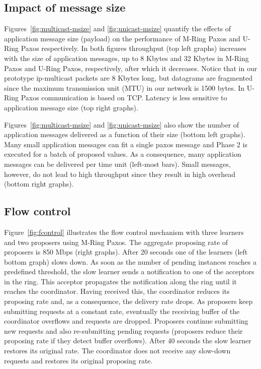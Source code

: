 \documentclass[final,3p,times,twocolumn,authoryear]{elsarticle}
\begin{document}
\subsection{Impact of message size}
\label{subsec:msgsize}

Figures~\ref{fig:multicast-msize} and \ref{fig:unicast-msize} quantify the effects of application message size (payload) on the performance of M-Ring Paxos and U-Ring Paxos respectively. In both figures throughput (top left graphs) increases with the size of application messages, up to 8 Kbytes and 32 Kbytes in M-Ring Paxos and U-Ring Paxos, respectively, after which it decreases. Notice that in our prototype ip-multicast packets are 8 Kbytes long, but datagrams are fragmented since the maximum transmission unit (MTU) in our network is 1500 bytes. In U-Ring Paxos communication is based on TCP. Latency is less sensitive to application message size (top right graphs). 

Figures~\ref{fig:multicast-msize} and \ref{fig:unicast-msize} also show the number of application messages delivered as a function of their size (bottom left graphs). Many small application messages can fit a single paxos message and Phase 2 is executed for a batch of proposed values. As a consequence, many application messages can be delivered per time unit (left-most bars). Small messages, however, do not lead to high throughput since they result in high overhead (bottom right graphs). 


\subsection{Flow control}
\label{sec:exp:flow-control}

Figure~\ref{fig:fcontrol} illustrates the flow control mechanism with three learners and two proposers using M-Ring Paxos. 
The aggregate proposing rate of proposers is 850 Mbps (right graphs). 
After 20 seconds one of the learners (left bottom graph) slows down. 
As soon as the number of pending instances reaches a predefined threshold, the slow learner sends a notification to one of the acceptors in the ring. 
This acceptor propagates the notification along the ring until it reaches the coordinator. 
Having received this, the coordinator reduces its proposing rate and, as a consequence, the delivery rate drops. 
As proposers keep submitting requests at a constant rate, eventually the receiving buffer of the coordinator overflows and requests are dropped. 
Proposers continue submitting new requests and also re-submitting pending requests (proposers reduce their proposing rate if they detect buffer overflows). 
After 40 seconds the slow learner restores its original rate. 
The coordinator does not receive any slow-down requests and restores its original proposing rate.
\end{document}
